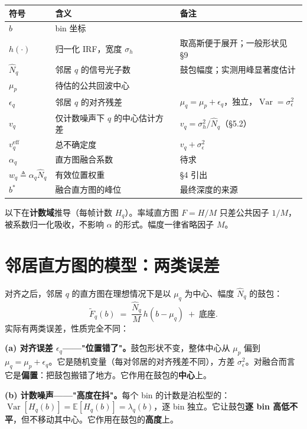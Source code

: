 \documentclass[11pt]{ctexart}
\newcommand{\E}{\mathbb{E}}
\newcommand{\Var}{\operatorname{Var}}
\begin{document}
\begin{center}
\begin{tabular}{@{}llp{}@{}}
\toprule
符号 & 含义 & 备注 \\
\midrule
$b$ & bin 坐标 & \\
$h(\cdot)$ & 归一化 IRF，宽度 $\sigma_h$ & 取高斯便于展开；一般形状见 \S9 \\
$\hat N_q$ & 邻居 $q$ 的信号光子数 & 鼓包幅度；实测用峰显著度估计 \\
$\mu_p$ & 待估的公共回波中心 & \\
$\epsilon_q$ & 邻居 $q$ 的对齐残差 & $\mu_q=\mu_p+\epsilon_q$，独立，$\Var=\sigma_\epsilon^2$ \\
$v_q$ & 仅计数噪声下 $q$ 的中心估计方差 & $v_q=\sigma_h^2/\hat N_q$（\S5.2） \\
$v^{\mathrm{eff}}_q$ & 总不确定度 & $v_q+\sigma_\epsilon^2$ \\
$\alpha_q$ & 直方图融合系数 & 待求 \\
$w_q\triangleq\alpha_q\hat N_q$ & 有效位置权重 & \S4 引出 \\
$b^*$ & 融合直方图的峰位 & 最终深度的来源 \\
\bottomrule
\end{tabular}
\end{center}

以下在\textbf{计数域}推导（每帧计数 $H_q$）。率域直方图 $F=H/M$ 只差公共因子 $1/M$，被系数归一化吸收，不影响 $\alpha$ 的形式。幅度一律省略因子 $M$。

\section{邻居直方图的模型：两类误差}

对齐之后，邻居 $q$ 的直方图在理想情况下是以 $\mu_q$ 为中心、幅度 $\hat N_q$ 的鼓包：
\begin{equation}
  \widetilde F_q(b)\;=\;\frac{\hat N_q}{M}\,h(b-\mu_q)\;+\;\text{底座}.
\end{equation}
实际有两类误差，性质完全不同：

\textbf{(a) 对齐误差 $\epsilon_q$——"位置错了"。}鼓包形状不变，整体中心从 $\mu_p$ 偏到 $\mu_q=\mu_p+\epsilon_q$。它是随机变量（每对邻居的对齐残差不同），方差 $\sigma_\epsilon^2$。对融合而言它是\textbf{偏置}：把鼓包搬错了地方。它作用在鼓包的\textbf{中心}上。

\textbf{(b) 计数噪声——"高度在抖"。}每个 bin 的计数是泊松型的：$\Var[H_q(b)]=\E[H_q(b)]=\lambda_q(b)$，逐 bin 独立。它让鼓包\textbf{逐 bin 高低不平}，但不移动其中心。它作用在鼓包的\textbf{高度}上。
\end{document}
